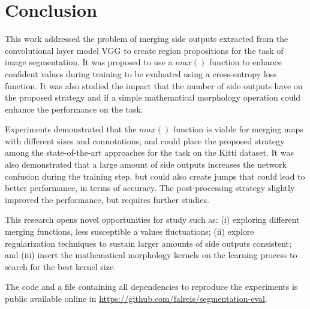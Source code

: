 \section{Conclusion}
\label{sec:conclusion}

This work addressed the problem of merging side outputs extracted from the convolutional layer model VGG to create region propositions for the task of image segmentation. It was proposed to use a $max()$ function to enhance confident values during training to be evaluated using a cross-entropy loss function. It was also studied the impact that the number of side outputs have on the proposed strategy and if a simple mathematical morphology operation could enhance the performance on the task. 

Experiments demonstrated that the $max()$ function is viable for merging maps with different sizes and connotations, and could place the proposed strategy among the state-of-the-art approaches for the task on the Kitti dataset. It was also demonstrated that a large amount of side outputs increases the network confusion during the training step, but could also create jumps that could lead to better performance, in terms of accuracy. The post-processing strategy slightly improved the performance, but requires further studies.

This research opens novel opportunities for study such as: (i) exploring different merging functions, less susceptible a values fluctuations;  (ii) explore regularization techniques to sustain larger amounts of side outputs consistent; and (iii) insert the mathematical morphology kernels on the learning process to search for the best kernel size. 
 
The code  and a file containing all dependencies to reproduce the experiments is public available online in \url{https://github.com/falreis/segmentation-eval}. 
